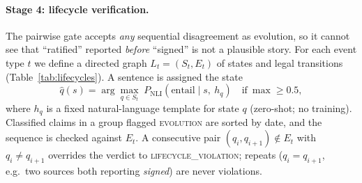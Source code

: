 \paragraph{Stage 4: lifecycle verification.}
The pairwise gate accepts \emph{any} sequential disagreement as evolution, so
it cannot see that ``ratified'' reported \emph{before} ``signed'' is not a
plausible story. For each event type $t$ we define a directed graph
$L_t=(S_t, E_t)$ of states and legal transitions
(Table~\ref{tab:lifecycles}). A sentence is assigned the state
\begin{equation}
  \hat{q}(s) = \arg\max_{q\in S_t}\; P_{\text{NLI}}(\text{entail}\mid s,\ h_q)
  \quad\text{if}\ \max \ge 0.5,
\end{equation}
where $h_q$ is a fixed natural-language template for state $q$ (zero-shot; no
training). Classified claims in a group flagged \textsc{evolution} are sorted
by date, and the sequence is checked against $E_t$. A consecutive pair
$(q_i,q_{i+1})\notin E_t$ with $q_i\ne q_{i+1}$ overrides the verdict to
\textsc{lifecycle\_violation}; repeats ($q_i=q_{i+1}$, e.g.\ two sources both
reporting \emph{signed}) are never violations.

